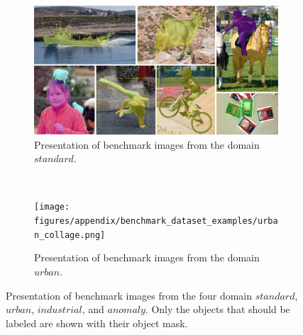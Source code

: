 
\begin{figure} [h!]
	\centering
	\begin{subfigure}[t]{1.0\textwidth}
		\centering
		\includegraphics[width=\textwidth]{figures/appendix/benchmark_dataset_examples/standard_collage.png}
		\caption{
			Presentation of benchmark images from the domain $ standard $.
		}\label{fig:appendix_domain_standard}
	\end{subfigure}
	\\
	\begin{subfigure}[t]{1.0\textwidth}
		\centering
		\texttt{[image: figures/appendix/benchmark\_dataset\_examples/urban\_collage.png]}
		\caption{
			Presentation of benchmark images from the domain $ urban $.			
		} \label{fig:appendix_domain_urban}
	\end{subfigure}
	\caption[Illustration of various benchmark images]{	
		Presentation of benchmark images from the four domain $ standard $, $ urban $, $ industrial $, and $ anomaly $.	
		Only the objects that should be labeled are shown with their object mask.
	}\label{fig:appendix_benchmark_domains}
\end{figure}

